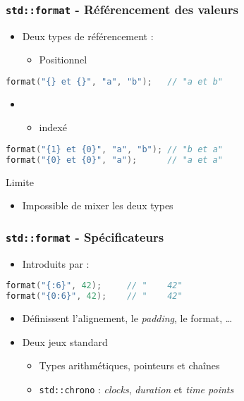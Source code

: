 \documentclass[C++.tex]{subfiles}
\begin{document}
\begin{frame}[fragile]
	\frametitle{\lstinline|std::format| - Référencement des valeurs}
	\begin{itemize}
		\item Deux types de référencement :
		\begin{itemize}
			\item Positionnel
		\end{itemize}
	\end{itemize}

	\begin{lstlisting}[language=C++]
format("{} et {}", "a", "b"); 	// "a et b"\end{lstlisting}
	
	\begin{itemize}
		\item [] \begin{itemize}
			\item indexé
		\end{itemize}
	\end{itemize}
	
	\begin{lstlisting}[language=C++]
format("{1} et {0}", "a", "b"); // "b et a"
format("{0} et {0}", "a");      // "a et a"\end{lstlisting}
	
	
	\begin{alertblock}{Limite}
		\begin{itemize}
			\item Impossible de mixer les deux types
		\end{itemize}
	\end{alertblock}
\end{frame}

\begin{frame}[fragile]
	\frametitle{\lstinline|std::format| - Spécificateurs}
	\begin{itemize}
		\item Introduits par \og : \fg{}
	\end{itemize}

	\begin{lstlisting}[language=C++]
format("{:6}", 42);    	// "    42"
format("{0:6}", 42);    // "    42"\end{lstlisting}

	\begin{itemize}
		\item Définissent l'alignement, le \textit{padding}, le format, \ldots
		\item Deux jeux standard
		\begin{itemize}
			\item Types arithmétiques, pointeurs et chaînes
			\item \lstinline|std::chrono| : \textit{clocks}, \textit{duration} et \textit{time points}
		\end{itemize}
	\end{itemize}
\end{frame}
\end{document}
